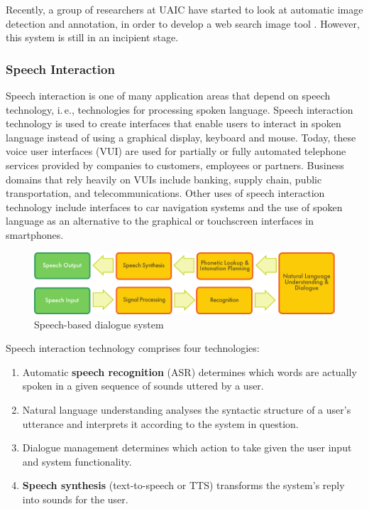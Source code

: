 \documentclass[]{../../metanetpaper}
\begin{document}
\begin{multicols}{2}
Recently, a group of researchers at UAIC have started to look at automatic image detection and annotation, in order to develop a web search image tool \cite{iftene}. However, this system is still in an incipient stage.

\subsubsection{Speech Interaction}

Speech interaction is one of many application areas that depend on speech technology, i.\,e., technologies for processing spoken language. Speech interaction technology is used to create interfaces that enable users to interact in spoken language instead of using a graphical display, keyboard and mouse.  Today, these voice user interfaces (VUI) are used for partially or fully automated telephone services provided by companies to customers, employees or partners. Business domains that rely heavily on VUIs include banking, supply chain, public transportation, and telecommunications. Other uses of speech interaction technology include interfaces to car navigation systems and the use of spoken language as an alternative to the graphical or touchscreen interfaces in smartphones.

\begin{figure}[htb]
  \center
  \includegraphics[width=\textwidth]{../_media/english/simple_speech-based_dialogue_architecture}
  \caption{Speech-based dialogue system}
  \label{fig:dialoguearch_en}
\end{figure}

Speech interaction technology comprises four technologies: 

\begin{enumerate}
\item Automatic \textbf{speech recognition} (ASR) determines which words are actually spoken in a given sequence of sounds uttered by a user.  
\item Natural language understanding analyses the syntactic structure of a user’s utterance and interprets it according to the system in question.
\item Dialogue management determines which action to take given the user input and system functionality.   
\item \textbf{Speech synthesis} (text-to-speech or TTS) transforms the system’s reply into sounds for the user.
\end{enumerate}


\end{multicols}
\end{document}
